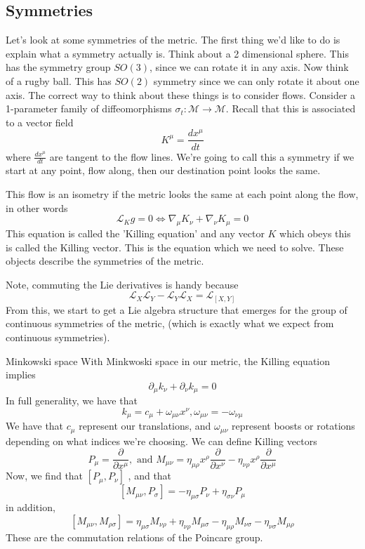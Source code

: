 \subsection{Symmetries}
Let's look at some symmetries of the metric. 
The first thing we'd like to do is explain what a symmetry actually is. 
Think about a 2 dimensional sphere. 
This has the symmetry group $ SO ( 3) $, 
since we can rotate it in any axis. Now think 
of a rugby ball. This has $ SO ( 2) $ symmetry since 
we can only rotate it about one axis. 
The correct way to think about these things is to consider flows. 
Consider a 1-parameter family of diffeomorphisms 
$ \sigma _ t : \mathcal{ M } \to \mathcal{ M } $. 
Recall that this is associated to a vector field 
\[
 K^ \mu =  \frac{dx ^ \mu }{ dt }
\] where $ \frac{ d x ^ \mu }{ dt } $ are tangent to the flow lines. 
We're going to call this a symmetry if we start at any point, 
flow along, then our destination point looks the same.

This flow is an isometry if the metric 
looks the same at each point along the flow, in other words 
\[
 \mathcal{ L }_K g = 0 \iff \nabla _ \mu K _ \nu + \nabla _ \nu K _ \mu  =0 
\] This equation is 
called the 'Killing equation' and any vector $ K  $ which 
obeys this is 
called the Killing vector. 
This is the equation which we need to solve. 
These objects describe the symmetries of the metric. 

Note, commuting the Lie derivatives is handy because 
\[
	\mathcal{ L } _ X \mathcal{ L } _ Y - \mathcal{ L } _ Y \mathcal{ L } _ X  = \mathcal{ L } _{ [ X, Y ] }
\] From this, we start to get a Lie 
algebra structure that emerges for the group 
of continuous symmetries of the metric, (which 
is exactly what we expect from continuous symmetries).

\begin{example}{Minkowski space} 
With Minkwoski space in our metric, 
the Killing equation implies 
\[
 \partial _ \mu k _ \nu + \partial  _ \nu k _ \mu  = 0
\] In full generality, we have that 
\[
	k _{ \mu }  = c_\mu + \omega _{ \mu \nu } x ^ \nu , \omega_{ \mu \nu }  =- \omega  _{  \nu \mu }
\] We have that $ c _ \mu $ represent our translations, 
and $ \omega_{ \mu \nu } $ represent boosts or rotations 
depending on what indices we're choosing. 
We can define Killing vectors 
\[
 P _ \mu  = \frac{\partial   }{ \partial  x ^ \mu } , \text{ and } M_{ \mu \nu } 
  = \eta _{ \mu \rho } x ^ \rho \frac{\partial  }{\partial  x ^ \nu }   - \eta _{ \nu \rho } x ^ \rho \frac{\partial  }{\partial  x ^ \mu } 
\] Now, we find that $ [ P_\mu, P _ \nu  ]  $ , and that 
\[
	[ M_{ \mu \nu }, P _ \sigma ] =  - \eta _{ \mu \sigma } P _ \nu + \eta_{ \sigma \nu } P_{ \mu } 
\] in addition, 
\[
	[ M_{ \mu \nu } , M_{ \rho \sigma  } ] = \eta_{ \mu \sigma } M_{ \nu \rho } + \eta_{ \nu \rho } M_{ \mu \sigma } 
	 - \eta_{ \mu \rho } M_{ \nu \sigma } - \eta_{ \nu \sigma } M_{ \mu \rho }
\] These are the commutation relations of the Poincare group. 	
\end{example}


